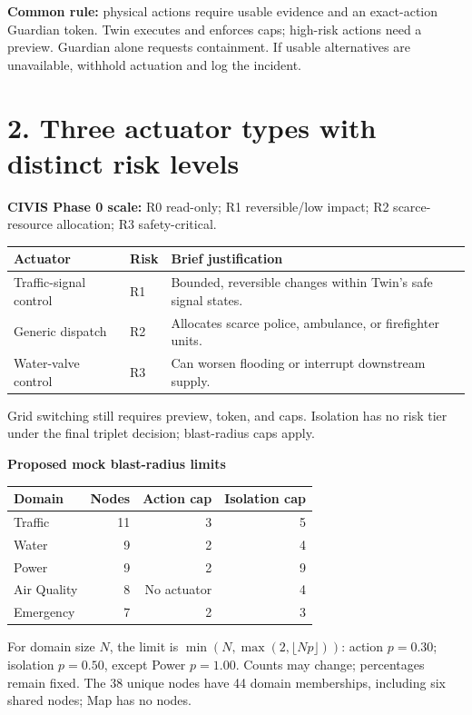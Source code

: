 \documentclass[a4paper,10pt,english]{article}
\begin{document}
\textbf{Common rule:} physical actions require usable evidence and an exact-action Guardian token. Twin executes and enforces caps; high-risk actions need a preview. Guardian alone requests containment. If usable alternatives are unavailable, withhold actuation and log the incident.

\section*{2. Three actuator types with distinct risk levels}
\textbf{CIVIS Phase 0 scale:} R0 read-only; R1 reversible/low impact; R2 scarce-resource allocation; R3 safety-critical.
\begin{tabularx}{\textwidth}{@{}p{}p{}Y@{}}
\toprule\textbf{Actuator} & \textbf{Risk} & \textbf{Brief justification}\\\midrule
Traffic-signal control & R1 & Bounded, reversible changes within Twin's safe signal states.\\
Generic dispatch & R2 & Allocates scarce police, ambulance, or firefighter units.\\
Water-valve control & R3 & Can worsen flooding or interrupt downstream supply.\\\bottomrule
\end{tabularx}
Grid switching still requires preview, token, and caps. Isolation has no risk tier under the final triplet decision; blast-radius caps apply.

\textbf{Proposed mock blast-radius limits}

\begin{tabularx}{\textwidth}{@{}Yrrr@{}}
\toprule\textbf{Domain} & \textbf{Nodes} & \textbf{Action cap} & \textbf{Isolation cap}\\\midrule
Traffic & 11 & 3 & 5\\
Water & 9 & 2 & 4\\
Power & 9 & 2 & 9\\
Air Quality & 8 & No actuator & 4\\
Emergency & 7 & 2 & 3\\\bottomrule
\end{tabularx}

For domain size $N$, the limit is $\min(N,\max(2,\lfloor Np\rfloor))$: action $p=0.30$; isolation $p=0.50$, except Power $p=1.00$. Counts may change; percentages remain fixed. The 38 unique nodes have 44 domain memberships, including six shared nodes; Map has no nodes.

\newpage
\end{document}
